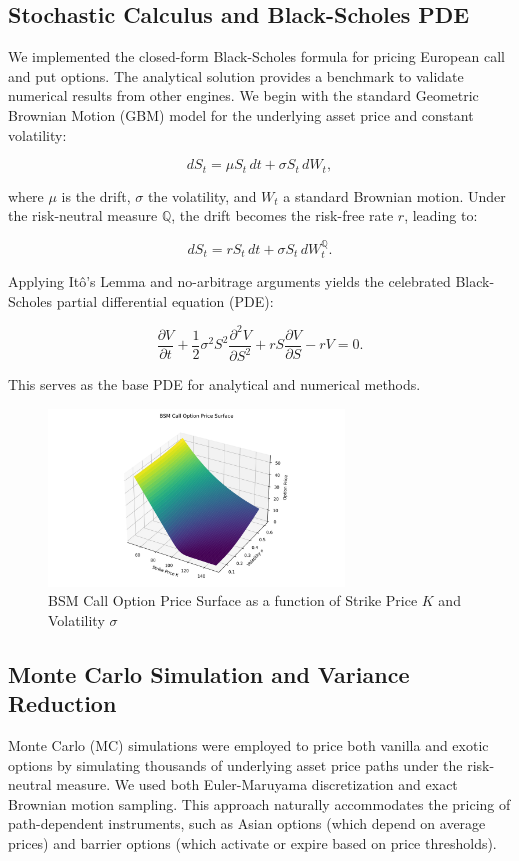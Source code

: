 \documentclass[12pt,a4paper]{article}
\begin{document}
\subsection{Stochastic Calculus and Black-Scholes PDE}
We implemented the closed-form Black-Scholes formula for pricing European call and put options. The analytical solution provides a benchmark to validate numerical results from other engines. We begin with the standard Geometric Brownian Motion (GBM) model for the underlying asset price and constant volatility:

\[
dS_t = \mu S_t \,dt + \sigma S_t \,dW_t,
\]

where \( \mu \) is the drift, \( \sigma \) the volatility, and \( W_t \) a standard Brownian motion. Under the risk-neutral measure \( \mathbb{Q} \), the drift becomes the risk-free rate \( r \), leading to:

\[
dS_t = r S_t \,dt + \sigma S_t \,dW_t^\mathbb{Q}.
\]

Applying Itô’s Lemma and no-arbitrage arguments yields the celebrated Black-Scholes partial differential equation (PDE):

\[
\frac{\partial V}{\partial t} + \frac{1}{2} \sigma^2 S^2 \frac{\partial^2 V}{\partial S^2} + r S \frac{\partial V}{\partial S} - rV = 0.
\]

This serves as the base PDE for analytical and numerical methods.

\begin{figure}[H]
\centering
\includegraphics[width=0.7\textwidth]{../plots/bsm_surface.png}
\caption{BSM Call Option Price Surface as a function of Strike Price $K$ and Volatility $\sigma$}
\end{figure}

\subsection{Monte Carlo Simulation and Variance Reduction}
Monte Carlo (MC) simulations were employed to price both vanilla and exotic options by simulating thousands of underlying asset price paths under the risk-neutral measure. We used both Euler-Maruyama discretization and exact Brownian motion sampling. This approach naturally accommodates the pricing of path-dependent instruments, such as Asian options (which depend on average prices) and barrier options (which activate or expire based on price thresholds).
\end{document}
